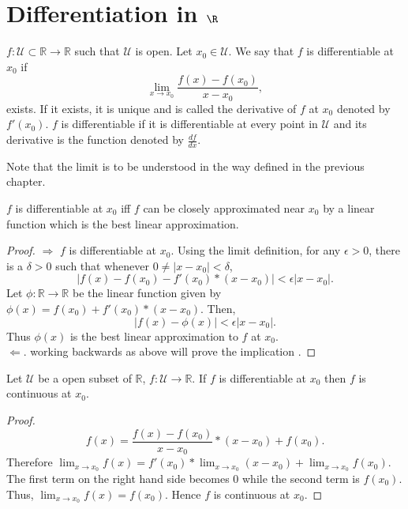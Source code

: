 \chapter{Differentiation in \texorpdfstring{$\R$}{}}
\begin{Definition}[name=differentiable functions]
    $f : \mathcal{U} \subset \mathbb{R} \to \mathbb{R}$ such that $\mathcal{U}$ is open. Let $x_0
    \in \mathcal{U}$. We say that $f$ is differentiable at $x_0$ if
    \begin{equation*}
	\lim_{x \to x_0} \frac{f(x) - f(x_0)}{x - x_0},
    \end{equation*}	
    exists. If it exists, it is unique and is called the derivative of $f$ at $x_0$ denoted by
    $f'(x_0)$.  $f$ is differentiable if it is differentiable at every point in $\mathcal{U}$ and
    its derivative is the function denoted by $\frac{df}{dx}$.
\end{Definition}
Note that the limit is to be understood in the way defined in the previous chapter.
\begin{Proposition}
    $f$ is differentiable at $x_0$ iff $f$ can be closely approximated near $x_0$ by a linear
    function which is the best linear approximation.
\end{Proposition}
\begin{proof}
    $\Rightarrow$ $f$ is differentiable at $x_0$. Using the limit definition, for any 
$\epsilon > 0$, there is a $\delta > 0$ such that whenever $0 \neq \lvert x - x_0 \rvert < \delta$, 
\[\lvert f(x) - f(x_0) - f'(x_0)*(x - x_0) \rvert < \epsilon\lvert x - x_0 \rvert. \] Let $\phi :
\mathbb{R} \to \mathbb{R}$ be the linear function given by $\phi(x) = f(x_0) + f'(x_0)*(x-x_0)$.
Then, \[\lvert f(x) - \phi(x) \rvert < \epsilon\lvert x - x_0 \rvert. \] Thus $\phi(x)$ is the
best linear approximation to $f$ at $x_0$.
\\
$\Leftarrow$. working backwards as above will prove the implication .
\end{proof}
\begin{Proposition}
    Let $\mathcal{U}$ be a open subset of $\mathbb{R}$, $f : \mathcal{U} \to \mathbb{R}$. If $f$ is
    differentiable at $x_0$ then $f$ is continuous at $x_0$.
\end{Proposition}
\begin{proof}
    \[ f(x) = \frac{f(x) - f(x_0)}{x - x_0} *(x - x_0) + f(x_0) . \] 
    Therefore $\lim_{x \to x_0}f(x) = f'(x_0)* \lim_{x \to x_0}(x - x_0) + \lim_{x \to x_0}f(x_0)$.
    The first term on the right hand side becomes $0$ while the second term is $f(x_0)$. Thus,
    $\lim_{x \to x_0}f(x) = f(x_0)$. Hence $f$ is continuous at $x_0$. 
\end{proof}
